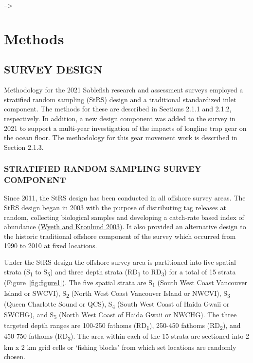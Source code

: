 \documentclass[12pt]{article}\usepackage[]{graphicx}\usepackage[]{color}
\begin{document}
\clearpage

--\textgreater{}

\hypertarget{methods}{%
\section{Methods}\label{methods}}

\hypertarget{survey-design}{%
\subsection{SURVEY DESIGN}\label{survey-design}}

Methodology for the 2021 Sablefish research and assessment surveys employed a stratified random sampling (StRS) design and a traditional standardized inlet component. The methods for these are described in Sections 2.1.1 and 2.1.2, respectively. In addition, a new design component was added to the survey in 2021 to support a multi-year investigation of the impacts of longline trap gear on the ocean floor. The methodology for this gear movement work is described in Section 2.1.3.

\hypertarget{stratified-random-sampling-survey-component}{%
\subsubsection{STRATIFIED RANDOM SAMPLING SURVEY COMPONENT}\label{stratified-random-sampling-survey-component}}

Since 2011, the StRS design has been conducted in all offshore survey areas. The StRS design began in 2003 with the purpose of distributing tag releases at random, collecting biological samples and developing a catch-rate based index of abundance (\protect\hyperlink{ref-Wyeth2003}{Wyeth and Kronlund 2003}). It also provided an alternative design to the historic traditional offshore component of the survey which occurred from 1990 to 2010 at fixed locations.

Under the StRS design the offshore survey area is partitioned into five spatial strata (S\textsubscript{1} to S\textsubscript{5}) and three depth strata (RD\textsubscript{1} to RD\textsubscript{3}) for a total of 15 strata (Figure~\ref{fig:figure1}). The five spatial strata are S\textsubscript{1} (South West Coast Vancouver Island or SWCVI), S\textsubscript{2} (North West Coast Vancouver Island or NWCVI), S\textsubscript{3} (Queen Charlotte Sound or QCS), S\textsubscript{4} (South West Coast of Haida Gwaii or SWCHG), and S\textsubscript{5} (North West Coast of Haida Gwaii or NWCHG). The three targeted depth ranges are 100-250 fathoms (RD\textsubscript{1}), 250-450 fathoms (RD\textsubscript{2}), and 450-750 fathoms (RD\textsubscript{3}). The area within each of the 15 strata are sectioned into 2 km x 2 km grid cells or `fishing blocks' from which set locations are randomly chosen.
\end{document}

